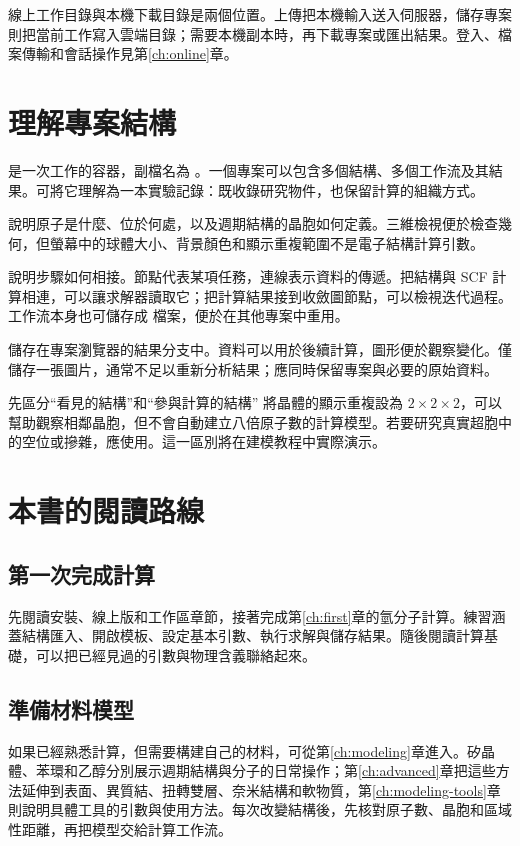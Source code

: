 線上工作目錄與本機下載目錄是兩個位置。上傳把本機輸入送入伺服器，儲存專案則把當前工作寫入雲端目錄；需要本機副本時，再下載專案或匯出結果。登入、檔案傳輸和會話操作見第\ref{ch:online}章。

\section{理解專案結構}
是一次工作的容器，副檔名為 。一個專案可以包含多個結構、多個工作流及其結果。可將它理解為一本實驗記錄：既收錄研究物件，也保留計算的組織方式。

說明原子是什麼、位於何處，以及週期結構的晶胞如何定義。三維檢視便於檢查幾何，但螢幕中的球體大小、背景顏色和顯示重複範圍不是電子結構計算引數。

說明步驟如何相接。節點代表某項任務，連線表示資料的傳遞。把結構與 SCF 計算相連，可以讓求解器讀取它；把計算結果接到收斂圖節點，可以檢視迭代過程。工作流本身也可儲存成  檔案，便於在其他專案中重用。

儲存在專案瀏覽器的結果分支中。資料可以用於後續計算，圖形便於觀察變化。僅儲存一張圖片，通常不足以重新分析結果；應同時保留專案與必要的原始資料。

\begin{notebox}{先區分“看見的結構”和“參與計算的結構”}
將晶體的顯示重複設為 $2\times2\times2$，可以幫助觀察相鄰晶胞，但不會自動建立八倍原子數的計算模型。若要研究真實超胞中的空位或摻雜，應使用。這一區別將在建模教程中實際演示。
\end{notebox}

\section{本書的閱讀路線}
\subsection{第一次完成計算}
先閱讀安裝、線上版和工作區章節，接著完成第\ref{ch:first}章的氫分子計算。練習涵蓋結構匯入、開啟模板、設定基本引數、執行求解與儲存結果。隨後閱讀計算基礎，可以把已經見過的引數與物理含義聯絡起來。

\subsection{準備材料模型}
如果已經熟悉計算，但需要構建自己的材料，可從第\ref{ch:modeling}章進入。矽晶體、苯環和乙醇分別展示週期結構與分子的日常操作；第\ref{ch:advanced}章把這些方法延伸到表面、異質結、扭轉雙層、奈米結構和軟物質，第\ref{ch:modeling-tools}章則說明具體工具的引數與使用方法。每次改變結構後，先核對原子數、晶胞和區域性距離，再把模型交給計算工作流。

